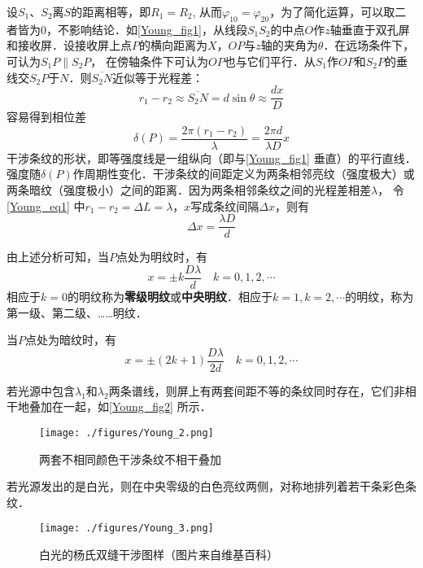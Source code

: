 设$S_1$、$S_2$离$S$的距离相等，即$R_1=R_2$, 从而$\varphi_{10}=\varphi_{20}$，为了简化运算，可以取二者皆为$0$，不影响结论．如\autoref{Young_fig1}，从线段$S_1S_2$的中点$O$作$z$轴垂直于双孔屏和接收屏．设接收屏上点$P$的横向距离为$X$，$OP$与$z$轴的夹角为$\theta$．在远场条件下，可认为$S_1P\parallel S_2P$， 在傍轴条件下可认为$OP$也与它们平行．从$S_1$作$OP$和$S_2P$的垂线交$S_2P$于$N$．则$\overline{S_2N}$近似等于光程差：
\begin{equation} \label{Young_eq1}
r_{1}-r_{2} \approx \overline{S_{2} N}=d \sin \theta \approx \frac{d x}{D}
\end{equation}
容易得到相位差
\begin{equation}
\delta(P)=\frac{2 \pi\left(r_{1}-r_{2}\right)}{\lambda}=\frac{2 \pi d}{\lambda D} x
\end{equation}
干涉条纹的形状，即等强度线是一组纵向（即与\autoref{Young_fig1} 垂直）的平行直线．强度随$\delta(P)$作周期性变化．干涉条纹的间距定义为两条相邻亮纹（强度极大）或两条暗纹（强度极小）之间的距离．因为两条相邻条纹之间的光程差相差$\lambda$， 令\autoref{Young_eq1} 中$r_1-r_2=\Delta L=\lambda$，$ x $写成条纹间隔$\Delta x$，则有
\begin{equation}
\Delta x=\frac{\lambda D}{d}
\end{equation}

由上述分析可知，当$P$点处为明纹时，有
\begin{equation}
x=\pm k \frac{D \lambda}{d} \quad k=0,1,2, \cdots
\end{equation}
相应于$k=0$的明纹称为\textbf{零级明纹}或\textbf{中央明纹}．相应于$k=1, k=2, \cdots$的明纹，称为第一级、第二级、……明纹．

当$P$点处为暗纹时，有
\begin{equation}
x=\pm(2 k+1) \frac{D \lambda}{2 d} \quad k=0,1,2, \cdots
\end{equation}

若光源中包含$\lambda_1$和$\lambda_2$两条谱线，则屏上有两套间距不等的条纹同时存在，它们非相干地叠加在一起，如\autoref{Young_fig2} 所示．
\begin{figure}[ht]
\centering
\texttt{[image: ./figures/Young\_2.png]}
\caption{两套不相同颜色干涉条纹不相干叠加} \label{Young_fig2}
\end{figure}
若光源发出的是白光，则在中央零级的白色亮纹两侧，对称地排列着若干条彩色条纹．
\begin{figure}[ht]
\centering
\texttt{[image: ./figures/Young\_3.png]}
\caption{白光的杨氏双缝干涉图样（图片来自维基百科）} \label{Young_fig3}
\end{figure}
